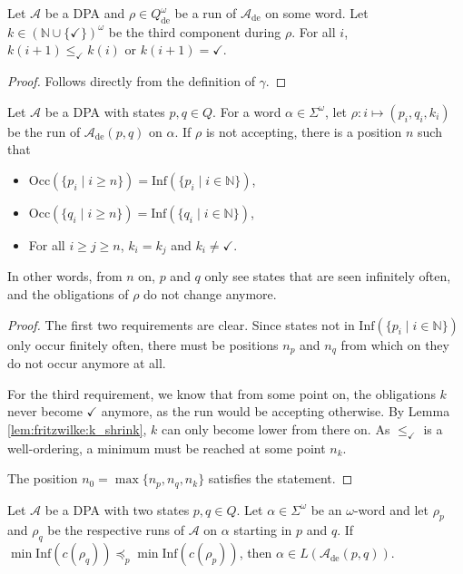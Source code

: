 \begin{lem}
\label{lem:fritzwilke:k_shrink}
	Let $\mathcal{A}$ be a DPA and $\rho \in Q_\text{de}^\omega$ be a run of $\mathcal{A}_\text{de}$ on some word. Let $k \in (\mathbb{N} \cup \{\checkmark\})^\omega$ be the third component during $\rho$. For all $i$, $k(i+1) \leq_\checkmark k(i)$ or $k(i+1) = \checkmark$.
\end{lem}

\begin{proof}
	Follows directly from the definition of $\gamma$.
\end{proof}

\begin{lem}
\label{lem:fritzwilke:n0_exists}
	Let $\mathcal{A}$ be a DPA with states $p, q \in Q$. For a word $\alpha \in \Sigma^\omega$, let $\rho : i \mapsto (p_i, q_i, k_i)$ be the run of $\mathcal{A}_\text{de}(p, q)$ on $\alpha$. If $\rho$ is not accepting, there is a position $n$ such that
	\begin{itemize}
		\item $\text{Occ}(\{p_i \mid i \geq n\}) = \text{Inf}(\{p_i \mid i \in \mathbb{N}\})$,
		\item $\text{Occ}(\{q_i \mid i \geq n\}) = \text{Inf}(\{q_i \mid i \in \mathbb{N}\})$,
		\item For all $i \geq j \geq n$, $k_i = k_j$ and $k_i \neq \checkmark$.
	\end{itemize}
	
	In other words, from $n$ on, $p$ and $q$ only see states that are seen infinitely often, and the obligations of $\rho$ do not change anymore.
\end{lem}

\begin{proof}
	The first two requirements are clear. Since states not in $\text{Inf}(\{p_i \mid i \in \mathbb{N}\})$ only occur finitely often, there must be positions $n_p$ and $n_q$ from which on they do not occur anymore at all.
	
	For the third requirement, we know that from some point on, the obligations $k$ never become $\checkmark$ anymore, as the run would be accepting otherwise. By Lemma \ref{lem:fritzwilke:k_shrink}, $k$ can only become lower from there on. As $\leq_\checkmark$ is a well-ordering, a minimum must be reached at some point $n_k$.
	
	The position $n_0 = \max \{n_p, n_q, n_k\}$ satisfies the statement.
\end{proof}

\begin{lem}
\label{lem:fritzwilke:run_goodness_implies_de}
	Let $\mathcal{A}$ be a DPA with two states $p, q \in Q$. Let $\alpha \in \Sigma^\omega$ be an $\omega$-word and let $\rho_p$ and $\rho_q$ be the respective runs of $\mathcal{A}$ on $\alpha$ starting in $p$ and $q$. If $\min \text{Inf}(c(\rho_q)) \preceq_p \min \text{Inf}(c(\rho_p))$, then $\alpha \in L(\mathcal{A}_\text{de}(p, q))$.
\end{lem}

